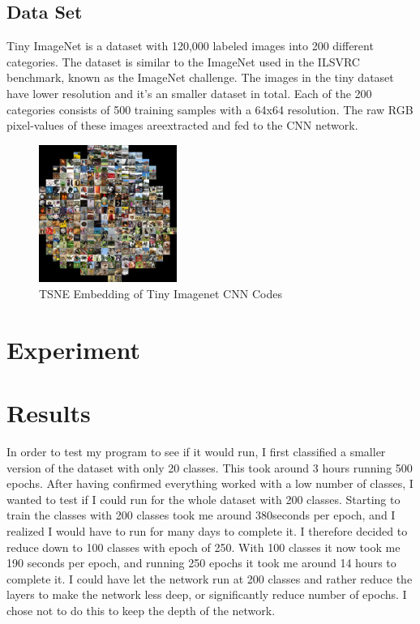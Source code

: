 \documentclass[twoside,11pt]{article}
\begin{document}
\subsection{Data Set}
Tiny ImageNet is a dataset with 120,000 labeled images into 200 different categories. The dataset is similar to the ImageNet used in the ILSVRC benchmark, known as the ImageNet challenge. The images in the tiny dataset have lower resolution and it's an smaller dataset in total. Each of the 200 categories consists of 500 training samples with a 64x64 resolution. The raw RGB pixel-values of these images areextracted and fed to the CNN network.

\begin{figure}
  \begin{center}
    \includegraphics[width=0.4\textwidth]{images/cnn_embed_1k.jpg}
  \end{center}
  \caption{TSNE Embedding of Tiny Imagenet CNN Codes}
  \label{fig:tiny-imagenet}
\end{figure}

\section{Experiment}


\section{Results}
In order to test my program to see if it would run, I first classified a smaller version of the dataset with only 20 classes. This took around 3 hours running 500 epochs. After having confirmed everything worked with a low number of classes, I wanted to test if I could run for the whole dataset with 200 classes. Starting to train the classes with 200 classes took me around 380seconds per epoch, and I realized I would have to run for many days to complete it. I therefore decided to reduce down to 100 classes with epoch of 250. With 100 classes it now took me 190 seconds per epoch, and running 250 epochs it took me around 14 hours to complete it. I could have let the network run at 200 classes and rather reduce the layers to make the network less deep, or significantly reduce number of epochs. I chose not to do this to keep the depth of the network.
\end{document}
